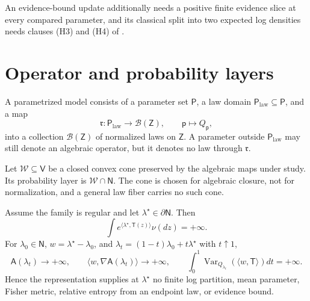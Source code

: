 An evidence-bound update additionally needs a positive finite evidence slice
at every compared parameter, and its classical split into two expected log
densities needs clauses (H3) and (H4) of .

\section{Operator and probability layers}
\label{sec:exp-layers}

A parametrized model consists of a parameter set \(\mathsf P\), a law domain
\(\mathsf P_{\mathrm{law}}\subseteq\mathsf P\), and a map
\begin{equation}
\mathfrak r:\mathsf P_{\mathrm{law}}\longrightarrow\mathcal B(\mathsf Z),
\qquad
\mathsf p\longmapsto Q_{\mathsf p},
\label{eq:exp-realization-map}
\end{equation}
into a collection \(\mathcal B(\mathsf Z)\) of normalized laws on
\(\mathsf Z\). A parameter outside \(\mathsf P_{\mathrm{law}}\) may still denote
an algebraic operator, but it denotes no law through \(\mathfrak r\).

Let \(\mathcal W\subseteq\mathsf V\) be a closed convex cone preserved by the
algebraic maps under study. Its probability layer is
\(\mathcal W\cap\mathsf N\). The cone is chosen for algebraic closure, not for
normalization, and a general law fiber carries no such cone.

Assume the family is regular and let \(\lambda^\star\in\partial\mathsf N\). Then
\begin{equation}
\int e^{\langle\lambda^\star,\mathsf T(z)\rangle}\nu(dz)=+\infty.
\label{eq:exp-boundary-diverges}
\end{equation}
For \(\lambda_0\in\mathsf N\), \(w=\lambda^\star-\lambda_0\), and
\(\lambda_t=(1-t)\lambda_0+t\lambda^\star\) with \(t\uparrow1\),
\begin{equation}
\mathsf A(\lambda_t)\to+\infty,\qquad
\langle w,\nabla\mathsf A(\lambda_t)\rangle\to+\infty,\qquad
\int_0^1\operatorname{Var}_{Q_{\lambda_t}}(\langle w,\mathsf T\rangle)dt
=+\infty.
\label{eq:exp-boundary-blowup}
\end{equation}
Hence the representation supplies at \(\lambda^\star\) no finite log
partition, mean parameter, Fisher metric, relative entropy from an endpoint
law, or evidence bound. 

